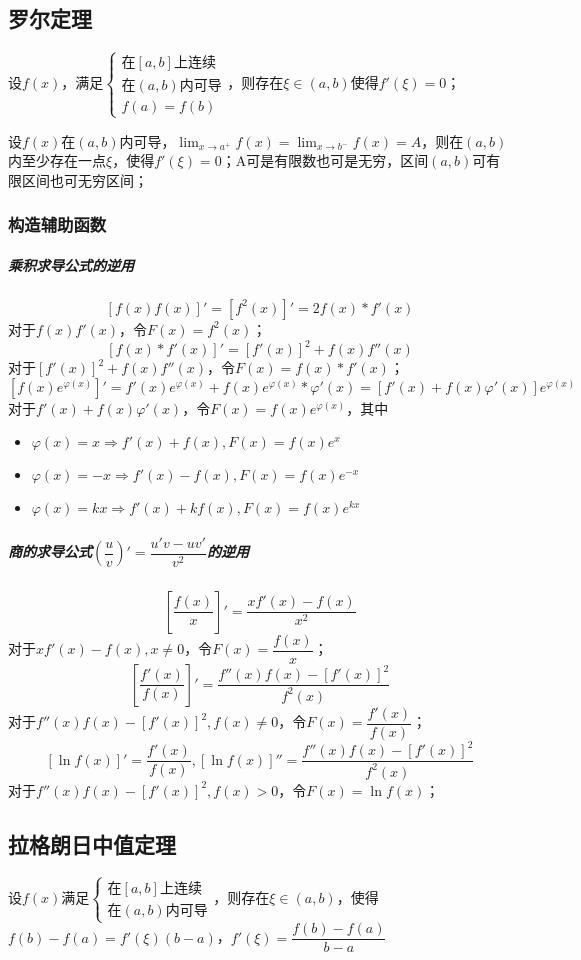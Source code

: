 \subsection{罗尔定理}
设\(f(x)\)，满足\(\begin{cases}
\text{在}[a, b]\text{上连续} \\ 
\text{在}(a, b)\text{内可导} \\ 
f(a) = f(b)
\end{cases}\)，则存在\(\xi \in (a, b)\)使得\(f'(\xi) = 0\)；

设\(f(x)\)在\((a, b)\)内可导，\(\displaystyle\lim_{x \to a^+}f(x) = \lim_{x \to b^-}f(x) = A\)，则在\((a, b)\)内至少存在一点\(\xi\)，使得\(f'(\xi) = 0\)；A可是有限数也可是无穷，区间\((a, b)\)可有限区间也可无穷区间；\textbf{}

\subsubsection{构造辅助函数}

\subparagraph{乘积求导公式的逆用}
\[[f(x)f(x)]' = [f^2(x)]' = 2f(x) * f'(x)\]
对于\(f(x)f'(x)\)，令\(F(x) = f^2(x)\)；
\[[f(x) * f'(x)]' = [f'(x)]^2 + f(x)f''(x)\]
对于\([f'(x)]^2 + f(x)f''(x)\)，令\(F(x) = f(x) * f'(x)\)；
\[[f(x)e^{\varphi(x)}]' = f'(x)e^{\varphi(x)} + f(x)e^{\varphi(x)} * \varphi'(x) = [f'(x) + f(x)\varphi'(x)]e^{\varphi(x)}\]
对于\(f'(x) + f(x)\varphi'(x)\)，令\(F(x) = f(x)e^{\varphi(x)}\)，其中\begin{itemize}
    \item \(\varphi(x) = x \Rightarrow f'(x) + f(x), F(x) = f(x)e^x\)
    \item \(\varphi(x) = -x \Rightarrow f'(x) - f(x), F(x) = f(x)e^{-x}\)
    \item \(\varphi(x) = kx \Rightarrow f'(x) + kf(x), F(x) = f(x)e^{kx}\)
\end{itemize}


\subparagraph{商的求导公式\((\dfrac{u}{v})' = \dfrac{u'v - uv'}{v^2}\)的逆用}

\[[\dfrac{f(x)}{x}]' = \dfrac{xf'(x) - f(x)}{x^2}\]
对于\(xf'(x) - f(x), x \neq 0\)，令\(F(x) = \dfrac{f(x)}{x}\)；
\[[\dfrac{f'(x)}{f(x)}]' = \dfrac{f''(x)f(x) - [f'(x)]^2}{f^2(x)}\]
对于\(f''(x)f(x) - [f'(x)]^2, f(x) \neq 0\)，令\(F(x) = \dfrac{f'(x)}{f(x)}\)；
\[[\ln f(x)]' = \dfrac{f'(x)}{f(x)}, [\ln f(x)]'' = \dfrac{f''(x)f(x) - [f'(x)]^2}{f^2(x)}\]
对于\(f''(x)f(x) - [f'(x)]^2, f(x) > 0\)，令\(F(x) = \ln f(x)\)；


\subsection{拉格朗日中值定理}
设\(f(x)\)满足\(\begin{cases}
\text{在}[a, b]\text{上连续} \\ 
\text{在}(a, b)\text{内可导}
\end{cases}\)，则存在\(\xi \in (a, b)\)，使得\(f(b) - f(a) = f'(\xi)(b - a)\)，\(f'(\xi) = \dfrac{f(b) - f(a)}{b - a}\)

